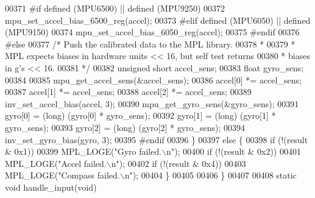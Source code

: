 \begin{DoxyCode}
{{{{{{{{00371 \textcolor{preprocessor}{#}\textcolor{preprocessor}{if} \textcolor{preprocessor}{defined} \textcolor{preprocessor}{(}\textcolor{preprocessor}{MPU6500}\textcolor{preprocessor}{)} \textcolor{preprocessor}{||} \textcolor{preprocessor}{defined} \textcolor{preprocessor}{(}\textcolor{preprocessor}{MPU9250}\textcolor{preprocessor}{)}
00372         mpu\_set\_accel\_bias\_6500\_reg(accel);
00373 \textcolor{preprocessor}{#}\textcolor{preprocessor}{elif} \textcolor{preprocessor}{defined} \textcolor{preprocessor}{(}\textcolor{preprocessor}{MPU6050}\textcolor{preprocessor}{)} \textcolor{preprocessor}{||} \textcolor{preprocessor}{defined} \textcolor{preprocessor}{(}\textcolor{preprocessor}{MPU9150}\textcolor{preprocessor}{)}
00374         mpu\_set\_accel\_bias\_6050\_reg(accel);
00375 \textcolor{preprocessor}{#}\textcolor{preprocessor}{endif}
00376 \textcolor{preprocessor}{#}\textcolor{preprocessor}{else}
00377         \textcolor{comment}{/* Push the calibrated data to the MPL library.}
00378 \textcolor{comment}{         *}
00379 \textcolor{comment}{         * MPL expects biases in hardware units << 16, but self test returns}
00380 \textcolor{comment}{         * biases in g's << 16.}
00381 \textcolor{comment}{         */}
00382         \textcolor{keywordtype}{unsigned} \textcolor{keywordtype}{short} accel\_sens;
00383         \textcolor{keywordtype}{float} gyro\_sens;
00384 
00385         mpu\_get\_accel\_sens(&accel\_sens);
00386         accel[0] *= accel\_sens;
00387         accel[1] *= accel\_sens;
00388         accel[2] *= accel\_sens;
00389         inv\_set\_accel\_bias(accel, 3);
00390         mpu\_get\_gyro\_sens(&gyro\_sens);
00391         gyro[0] = (\textcolor{keywordtype}{long}) (gyro[0] * gyro\_sens);
00392         gyro[1] = (\textcolor{keywordtype}{long}) (gyro[1] * gyro\_sens);
00393         gyro[2] = (\textcolor{keywordtype}{long}) (gyro[2] * gyro\_sens);
00394         inv\_set\_gyro\_bias(gyro, 3);
00395 \textcolor{preprocessor}{#}\textcolor{preprocessor}{endif}
00396     \}
00397     \textcolor{keywordflow}{else} \{
00398             \textcolor{keywordflow}{if} (!(result & 0x1))
00399                 MPL\_LOGE(\textcolor{stringliteral}{"Gyro failed.\(\backslash\)n"});
00400             \textcolor{keywordflow}{if} (!(result & 0x2))
00401                 MPL\_LOGE(\textcolor{stringliteral}{"Accel failed.\(\backslash\)n"});
00402             \textcolor{keywordflow}{if} (!(result & 0x4))
00403                 MPL\_LOGE(\textcolor{stringliteral}{"Compass failed.\(\backslash\)n"});
00404      \}
00405 
00406 \}
00407 
00408 \textcolor{keyword}{static} \textcolor{keywordtype}{void} handle_input(\textcolor{keywordtype}{void})
}}}}}}}}
\end{DoxyCode}
